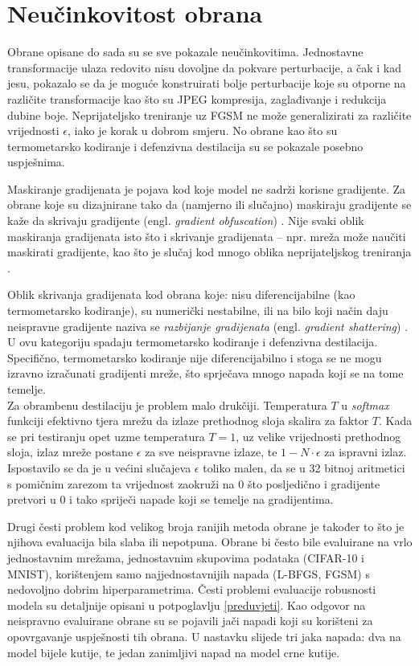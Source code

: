 \documentclass[utf8, diplomski]{fer}
\begin{document}
\section{Neučinkovitost obrana}\label{neucinkovitost}
Obrane opisane do sada su se sve pokazale neučinkovitima. Jednostavne transformacije ulaza redovito nisu dovoljne da pokvare perturbacije, a čak i kad jesu, pokazalo se da je moguće konstruirati bolje perturbacije koje su otporne na različite transformacije kao što su JPEG kompresija, zaglađivanje i redukcija dubine boje. Neprijateljsko treniranje uz FGSM ne može generalizirati za različite vrijednosti $\epsilon$, iako je korak u dobrom smjeru. No obrane kao što su termometarsko kodiranje i defenzivna destilacija su se pokazale posebno uspješnima. \par
Maskiranje gradijenata je pojava kod koje model ne sadrži korisne gradijente. Za obrane koje su dizajnirane tako da (namjerno ili slučajno) maskiraju gradijente se kaže da skrivaju gradijente (engl. \textit{gradient obfuscation}) \citep{obfuscated}. Nije svaki oblik maskiranja gradijenata isto što i skrivanje gradijenata -- npr. mreža može naučiti maskirati gradijente, kao što je slučaj kod mnogo oblika neprijateljskog treniranja \citep{ensemble_training}. \par
Oblik skrivanja gradijenata kod obrana koje: nisu diferencijabilne (kao termometarsko kodiranje), su numerički nestabilne, ili na bilo koji način daju neispravne gradijente naziva se \textit{razbijanje gradijenata} (engl. \textit{gradient shattering}) \citep{obfuscated}. U ovu kategoriju spadaju termometarsko kodiranje i defenzivna destilacija. Specifično, termometarsko kodiranje nije diferencijabilno i stoga se ne mogu izravno izračunati gradijenti mreže, što sprječava mnogo napada koji se na tome temelje. \\ Za obrambenu destilaciju je problem malo drukčiji. Temperatura $T$ u \textit{softmax} funkciji efektivno tjera mrežu da izlaze prethodnog sloja skalira za faktor $T$. Kada se pri testiranju opet uzme temperatura $T = 1$, uz velike vrijednosti prethodnog sloja, izlaz mreže postane $\epsilon$ za sve neispravne izlaze, te $1 - N \cdot \epsilon$ za ispravni izlaz. Ispostavilo se da je u većini slučajeva $\epsilon$ toliko malen, da se u 32 bitnoj aritmetici s pomičnim zarezom ta vrijednost zaokruži na $0$ što posljedično i gradijente pretvori u $0$ i tako spriječi napade koji se temelje na gradijentima. \par
Drugi česti problem kod velikog broja ranijih metoda obrane je također to što je njihova evaluacija bila slaba ili nepotpuna. Obrane bi često bile evaluirane na vrlo jednostavnim mrežama, jednostavnim skupovima podataka (CIFAR-10 i MNIST), korištenjem samo najjednostavnijih napada (L-BFGS, FGSM) s nedovoljno dobrim hiperparametrima. Česti problemi evaluacije robusnosti modela su detaljnije opisani u potpoglavlju \ref{preduvjeti}. Kao odgovor na neispravno evaluirane obrane su se pojavili jači napadi koji su korišteni za opovrgavanje uspješnosti tih obrana. U nastavku slijede tri jaka napada: dva na model bijele kutije, te jedan zanimljivi napad na model crne kutije.
\end{document}
